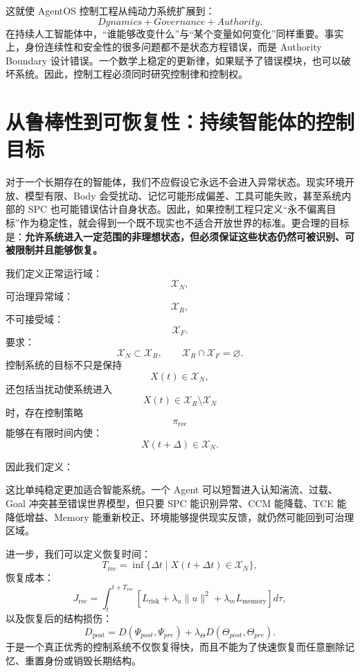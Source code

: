 这就使 AgentOS 控制工程从纯动力系统扩展到：
\[
\boxed{
Dynamics
+
Governance
+
Authority.
}
\]
在持续人工智能体中，“谁能够改变什么”与“某个变量如何变化”同样重要。事实上，身份连续性和安全性的很多问题都不是状态方程错误，而是 Authority Boundary 设计错误。一个数学上稳定的更新律，如果赋予了错误模块，也可以破坏系统。因此，控制工程必须同时研究控制律和控制权。

\section{从鲁棒性到可恢复性：持续智能体的控制目标}

对于一个长期存在的智能体，我们不应假设它永远不会进入异常状态。现实环境开放、模型有限、Body 会受扰动、记忆可能形成偏差、工具可能失败，甚至系统内部的 SPC 也可能错误估计自身状态。因此，如果控制工程只定义“永不偏离目标”作为稳定性，就会得到一个既不现实也不适合开放世界的标准。更合理的目标是：\textbf{允许系统进入一定范围的非理想状态，但必须保证这些状态仍然可被识别、可被限制并且能够恢复。}

我们定义正常运行域：
\[
\mathcal X_N,
\]
可治理异常域：
\[
\mathcal X_R,
\]
不可接受域：
\[
\mathcal X_F.
\]
要求：
\[
\mathcal X_N
\subset
\mathcal X_R,
\qquad
\mathcal X_R
\cap
\mathcal X_F
=
\varnothing.
\]
控制系统的目标不只是保持
\[
X(t)\in\mathcal X_N,
\]
还包括当扰动使系统进入
\[
X(t)\in
\mathcal X_R\setminus\mathcal X_N
\]
时，存在控制策略
\[
\pi_{\mathrm{rec}}
\]
能够在有限时间内使：
\[
X(t+\Delta)
\in
\mathcal X_N.
\]

因此我们定义：
\begin{statementbox}
\centering
{}
\end{statementbox}
这比单纯稳定更加适合智能系统。一个 Agent 可以短暂进入认知湍流、过载、Goal 冲突甚至错误世界模型，但只要 SPC 能识别异常、CCM 能降载、TCE 能降低增益、Memory 能重新校正、环境能够提供现实反馈，就仍然可能回到可治理区域。

进一步，我们可以定义恢复时间：
\[
T_{\mathrm{rec}}
=
\inf
\{
\Delta t
\mid
X(t+\Delta t)\in\mathcal X_N
\},
\]
恢复成本：
\[
J_{\mathrm{rec}}
=
\int_t^{t+T_{\mathrm{rec}}}
\left[
L_{\mathrm{risk}}
+
\lambda_u\|u\|^2
+
\lambda_mL_{\mathrm{memory}}
\right]d\tau,
\]
以及恢复后的结构损伤：
\[
D_{\mathrm{post}}
=
D(
\Psi_{post},
\Psi_{pre}
)
+
\lambda_\Theta
D(
\Theta_{post},
\Theta_{pre}
).
\]
于是一个真正优秀的控制系统不仅恢复得快，而且不能为了快速恢复而任意删除记忆、重置身份或销毁长期结构。

